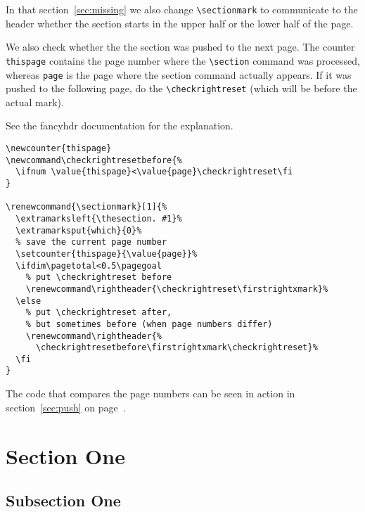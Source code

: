 \documentclass{article}
\newcommand\rightheader{\firstrightxmark}
\renewcommand{\sectionmark}[1]{%
    \extramarksleft{\thesection\ #1}}
\begin{document}
\noindent
\begin{boxedminipage}{\textwidth}
In that section~\ref{sec:missing} we also change \verb|\sectionmark| to communicate to the header whether the section starts in the upper half or the lower half of the page.

We also check whether the the section was pushed to the next page.
The counter \texttt{thispage} contains the page number where the \verb|\section|
command was processed, whereas \texttt{page} is the page where the section
command actually appears. If it was pushed to the following page, do
the \verb|\checkrightreset| (which will be before the actual mark).

See the \textsf{fancyhdr} documentation for the explanation.

\begin{verbatim}
\newcounter{thispage}
\newcommand\checkrightresetbefore{% 
  \ifnum \value{thispage}<\value{page}\checkrightreset\fi
}

\renewcommand{\sectionmark}[1]{%
  \extramarksleft{\thesection. #1}%
  \extramarksput{which}{0}%
  % save the current page number
  \setcounter{thispage}{\value{page}}%
  \ifdim\pagetotal<0.5\pagegoal
    % put \checkrightreset before
    \renewcommand\rightheader{\checkrightreset\firstrightxmark}%
  \else
    % put \checkrightreset after,
    % but sometimes before (when page numbers differ)
    \renewcommand\rightheader{%
      \checkrightresetbefore\firstrightxmark\checkrightreset}%
  \fi
}
\end{verbatim}

The code that compares the page numbers can be seen in action in section~\ref{sec:push} on page~\pageref{sec:push}.

\end{boxedminipage}

\newpage
\pagestyle{fancy}

\section{Section One}

\subsection{Subsection One}

 \lipsum[1-2]
\end{document}
